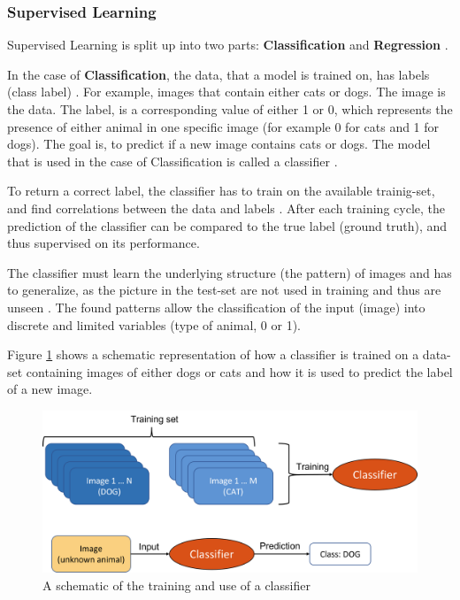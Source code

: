 \subsubsection*{Supervised Learning}\label{SUPER}
Supervised Learning is split up into two parts: \textbf{Classification} and \textbf{Regression} \cite{Janiesch,Theodoridis}.

In the case of \textbf{Classification}, the data, that a model is trained on, has labels (class label) \cite{Carleo}. For example, images that contain either cats or dogs. The image is the data. The label, is a corresponding value of either 1 or 0, which represents the presence of either animal in one specific image (for example 0 for cats and 1 for dogs). The goal is, to predict if a new image contains cats or dogs. The model that is used in the case of Classification is called a classifier \cite{Theodoridis}.

To return a correct label, the classifier has to train on the available trainig-set, and find correlations between the data and labels \cite{Carleo}.
After each training cycle, the prediction of the classifier can be compared to the true label (ground truth), and thus supervised on its performance.

The classifier must learn the underlying structure (the pattern) of images and has to generalize, as the picture in the test-set are not used in training and thus are unseen \cite{Bishop}. 
The found patterns allow the classification of the input (image) into discrete and limited variables (type of animal, 0 or 1). \cite{Theodoridis}

Figure \ref{fig:CATDOG} shows a schematic representation of how a classifier is trained on a data-set containing images of either dogs or cats and how it is used to predict the label of a new image.

\begin{figure}[H]
	\centering
	\includegraphics[width=0.9\linewidth]{IMGs/CATDOG.png}
	\caption{A schematic of the training and use of a classifier}
	\label{fig:CATDOG}
\end{figure}



